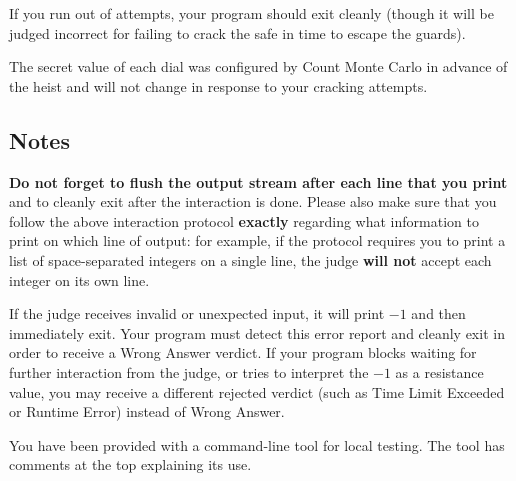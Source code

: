 If you run out of attempts, your program should exit cleanly (though it will be judged incorrect for failing to crack the safe in time to escape the guards).

The secret value of each dial was configured by Count Monte Carlo in advance of the heist and will not change in response to your cracking attempts.

\subsection*{Notes}

\textbf{Do not forget to flush the output stream after each line that you print} and to cleanly exit after the interaction is done. Please also make sure that you follow the above interaction protocol \textbf{exactly} regarding what information to print on which line of output: for example, if the protocol requires you to print a list of space-separated integers on a single line, the judge \textbf{will not} accept each integer on its own line.

If the judge receives invalid or unexpected input, it will print $-1$ and then immediately exit. Your program must detect this error report and cleanly exit in order to receive a Wrong Answer verdict. If your program blocks waiting for further interaction from the judge, or tries to interpret the $-1$ as a resistance value, you may receive a different rejected verdict (such as Time Limit Exceeded or Runtime Error) instead of Wrong Answer.

You have been provided with a command-line tool for local testing. The tool has comments at the top explaining its use.
